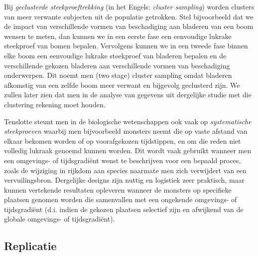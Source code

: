 \documentclass[
  12pt,dutch,coursenotes]{book}
\theoremstyle{definition}
\theoremstyle{definition}
\theoremstyle{definition}
\theoremstyle{remark}
\begin{document}
Bij \emph{geclusterde steekproeftrekking} (in het Engels: \emph{cluster sampling}) worden clusters van meer verwante subjecten uit de populatie getrokken. Stel bijvoorbeeld dat we de impact van verschillende vormen van beschadiging aan bladeren van een boom wensen te meten, dan kunnen we in een eerste fase een eenvoudige lukrake steekproef van bomen bepalen. Vervolgens kunnen we in een tweede fase binnen elke boom een eenvoudige lukrake steekproef van bladeren bepalen en de verschillende gekozen bladeren aan verschillende vormen van beschadiging onderwerpen. Dit noemt men (two stage) cluster sampling omdat bladeren afkomstig van een zelfde boom meer verwant en bijgevolg geclusterd zijn. We zullen later zien dat men in de analyse van gegevens uit dergelijke studie met die clustering rekening moet houden.

Tenslotte steunt men in de biologische wetenschappen ook vaak op \emph{systematische steekproeven} waarbij men bijvoorbeeld monsters neemt die op vaste afstand van elkaar bekomen worden of op voorafgekozen tijdstippen, en om die reden niet volledig lukraak genoemd kunnen worden. Dit wordt vaak gebruikt wanneer men een omgevings- of tijdsgradiënt wenst te beschrijven voor een bepaald proces, zoals de wijziging in rijkdom aan species naarmate men zich verwijdert van een vervuilingsbron. Dergelijke designs zijn nuttig en logistiek zeer praktisch, maar kunnen vertekende resultaten opleveren wanneer de monsters op specifieke plaatsen genomen worden die samenvallen met een ongekende omgevings- of tijdsgradiënt (d.i. indien de gekozen plaatsen selectief zijn en afwijkend van de globale omgevings- of tijdsgradiënt).

\hypertarget{replicatie}{%
\subsection{Replicatie}\label{replicatie}}
\end{document}
